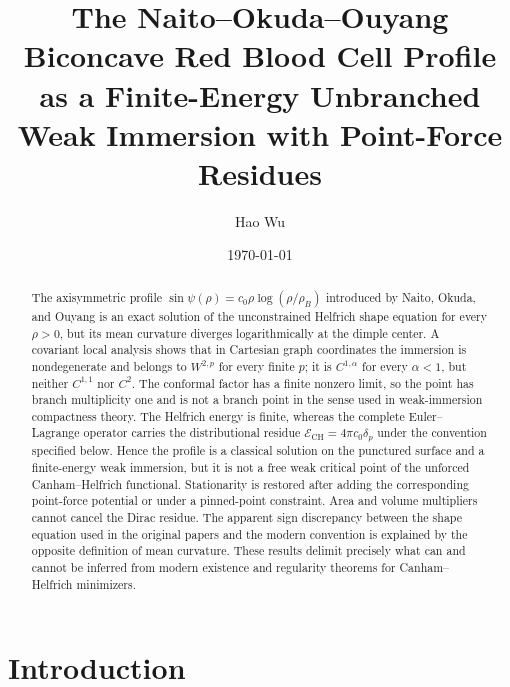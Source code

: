 \documentclass[preprint,amsmath,amssymb,aps,prl,superscriptaddress,nofootinbib,floatfix]{revtex4-2}
\newcommand{\E}{\mathcal E}
\newcommand{\CH}{\mathrm{CH}}
\begin{document}
\title{The Naito--Okuda--Ouyang Biconcave Red Blood Cell Profile as a Finite-Energy Unbranched Weak Immersion with Point-Force Residues}
\author{Hao Wu}

\date{\today}

\begin{abstract}
The axisymmetric profile \(\sin\psi(\rho)=c_0\rho\log(\rho/\rho_B)\) introduced by Naito, Okuda, and Ouyang is an exact solution of the unconstrained Helfrich shape equation for every \(\rho>0\), but its mean curvature diverges logarithmically at the dimple center. A covariant local analysis shows that in Cartesian graph coordinates the immersion is nondegenerate and belongs to \(W^{2,p}\) for every finite \(p\); it is \(C^{1,\alpha}\) for every \(\alpha<1\), but neither \(C^{1,1}\) nor \(C^2\). The conformal factor has a finite nonzero limit, so the point has branch multiplicity one and is not a branch point in the sense used in weak-immersion compactness theory. The Helfrich energy is finite, whereas the complete Euler--Lagrange operator carries the distributional residue \(\E_{\CH}=4\pi c_0\delta_p\) under the convention specified below. Hence the profile is a classical solution on the punctured surface and a finite-energy weak immersion, but it is not a free weak critical point of the unforced Canham--Helfrich functional. Stationarity is restored after adding the corresponding point-force potential or under a pinned-point constraint. Area and volume multipliers cannot cancel the Dirac residue. The apparent sign discrepancy between the shape equation used in the original papers and the modern convention is explained by the opposite definition of mean curvature. These results delimit precisely what can and cannot be inferred from modern existence and regularity theorems for Canham--Helfrich minimizers.
\end{abstract}

\maketitle



\section{Introduction}\label{sec:introduction}
\end{document}
